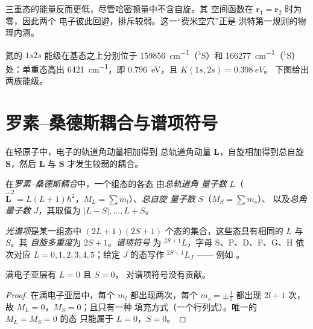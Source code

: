 三重态的能量反而更低，尽管哈密顿量中不含自旋。其
空间函数在 $\mathbf r_1 = \mathbf r_2$ 时为零，因此两个
电子彼此回避，排斥较弱。这一“费米空穴”正是
洪特第一规则的物理内涵。

\begin{example}\label{ex:b3:many-electron-atoms:K}
氦的 $1s2s$ 能级在基态之上分别位于 \qty{159856}{cm^{-1}}（${}^3$S）和
\qty{166277}{cm^{-1}}（${}^1$S）处：单重态高出
\qty{6421}{cm^{-1}}，即 \qty{0.796}{eV}，且 $K(1s,2s) = \qty{0.398}{eV}$。
下图给出两族能级。
\end{example}

\section{罗素–桑德斯耦合与谱项符号}

在轻原子中，电子的轨道角动量相加得到
总轨道角动量 $\mathbf L$，自旋相加得到总自旋 $\mathbf S$，然后
$\mathbf L$ 与 $\mathbf S$ 才发生较弱的耦合。

\begin{definition}[罗素–桑德斯耦合]\label{def:b3:many-electron-atoms:russell-saunders}
在\emph{罗素–桑德斯耦合}中，一个组态的各态
由\emph{总轨道角
量子数}
$L$（$\hat{\mathbf L}^2 = L(L+1)\hbar^2$，$M_L = \sum m_l$）、\emph{总自旋
量子数} $S$（$M_S = \sum m_s$）、
以及\emph{总角量子数}
$J$，其取值为 $|L - S|, \dots, L + S$。
\end{definition}

\begin{definition}\label{def:b3:many-electron-atoms:term}
\emph{光谱项}是某一组态中
$(2L+1)(2S+1)$ 个态的集合，这些态具有相同的 $L$ 与 $S$。其
\emph{自旋多重度}为 $2S + 1$。\emph{谱项符号}
为 ${}^{2S+1}L$，字母 S、P、D、F、G、H
依次对应 $L = 0, 1, 2, 3, 4, 5$；给定 $J$ 的态写作 ${}^{2S+1}L_J$ ——
例如 。
\end{definition}

\begin{proposition}[闭壳层]\label{prop:b3:many-electron-atoms:closed-shell}
满电子亚层有 $L = 0$ 且 $S = 0$，
对谱项符号没有贡献。
\end{proposition}

\begin{proof}
在满电子亚层中，每个 $m_l$ 都出现两次，每个 $m_s = \pm\frac12$
都出现 $2l+1$ 次，故 $M_L = 0$，$M_S = 0$；且只有一种
填充方式（一个行列式）。唯一的 $M_L = M_S = 0$ 的态
只能属于 $L = 0$，$S = 0$。
\end{proof}

